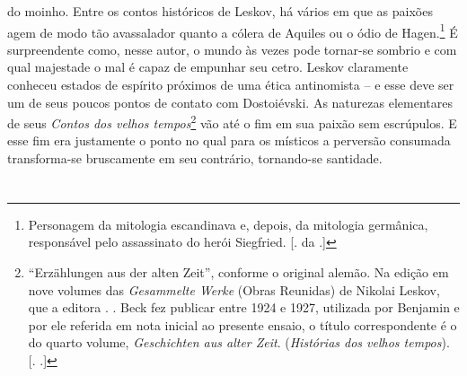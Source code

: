 do moinho. Entre os contos históricos de Leskov, há vários em que as
paixões agem de modo tão avassalador quanto a cólera de Aquiles ou o
ódio de Hagen.\footnote{Personagem da mitologia escandinava e, depois,
  da mitologia germânica, responsável pelo assassinato do herói
  Siegfried. [. da .]} É surpreendente como, nesse autor, o mundo
às vezes pode tornar-se sombrio e com qual majestade o mal é capaz de
empunhar seu cetro. Leskov claramente conheceu estados de espírito
próximos de uma ética antinomista -- e esse deve ser um de seus poucos
pontos de contato com Dostoiévski. As naturezas elementares de seus
\emph{Contos dos velhos tempos}\footnote{``Erzählungen aus der alten
  Zeit'', conforme o original alemão. Na edição
  em nove volumes das \emph{Gesammelte Werke} (Obras Reunidas) de
  Nikolai Leskov, que a editora . . Beck fez publicar entre 1924 e
  1927, utilizada por Benjamin e por ele referida em nota inicial ao
  presente ensaio, o título correspondente é o do quarto
  volume, \emph{Geschichten aus alter Zeit}. (\emph{Histórias dos velhos tempos}).
  [. .]} vão até o fim em sua paixão sem escrúpulos. E esse
fim era justamente o ponto no qual para os místicos a perversão
consumada transforma-se bruscamente em seu contrário, tornando-se
santidade.

\section{}

